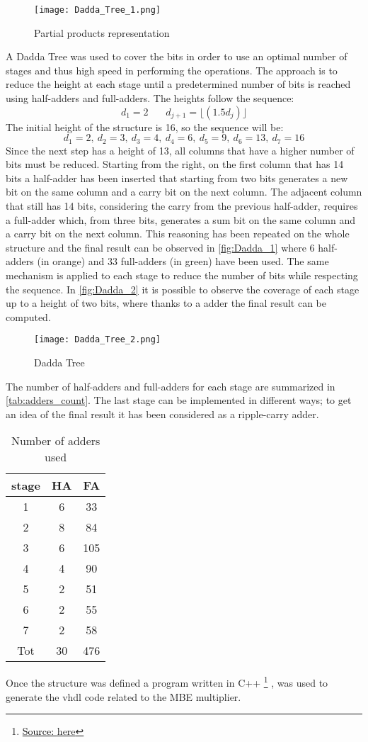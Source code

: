 \begin{figure}[htb]
	\center
	\texttt{[image: Dadda\_Tree\_1.png]}
	\caption{Partial products representation}
	\label{fig:Dadda_1}
\end{figure}
A Dadda Tree was used to cover the bits in order to use an optimal number of stages and thus high speed in performing the operations. The approach is to reduce the height at each stage until a predetermined number of bits is reached using half-adders and full-adders. The heights follow the sequence:
$$
d_1 = 2 \ \ \ \ \ \ \ \ d_{j+1} = \lfloor(1.5d_j)\rfloor
$$
The initial height of the structure is 16, so the sequence will be:
$$
d_1 = 2,\ d_2 = 3,\ d_3 = 4,\
d_4 = 6,\ d_5 = 9,\ d_6 = 13,\ d_7 = 16
$$
Since the next step has a height of 13, all columns that have a higher number of bits must be reduced. Starting from the right, on the first column that has 14 bits a half-adder has been inserted that starting from two bits generates a new bit on the same column and a carry bit on the next column. The adjacent column that still has 14 bits, considering the carry from the previous half-adder, requires a full-adder which, from three bits, generates a sum bit on the same column and a carry bit on the next column. This reasoning has been repeated on the whole structure and the final result can be observed in \autoref{fig:Dadda_1} where 6 half-adders (in orange) and 33 full-adders (in green) have been used.
The same mechanism is applied to each stage to reduce the number of bits while respecting the sequence. In \autoref{fig:Dadda_2} it is possible to observe the coverage of each stage up to a height of two bits, where thanks to a adder the final result can be computed.
\begin{figure}[htb]
	\center
	\texttt{[image: Dadda\_Tree\_2.png]}
	\caption{Dadda Tree }
	\label{fig:Dadda_2}
\end{figure}
The number of half-adders and full-adders for each stage are summarized in \autoref{tab:adders_count}. The last stage can be implemented in different ways; to get an idea of the final result it has been considered as a ripple-carry adder.
\begin{table}[htb!]
	\centering
	\begin{tabular}{ccc}
		stage & HA & FA \\
		\hline
		1 & 6 & 33\\
		2 & 8 & 84\\
		3 & 6 & 105\\
		4 & 4 & 90\\
		5 & 2 & 51\\
		6 & 2 & 55\\
		7 & 2 & 58\\
		Tot & 30 & 476\\
	\end{tabular}
	\label{tab:adders_count}
	\caption{Number of adders used}
\end{table}
Once the structure was defined a program written in C++ \footnote{\href{https://github.com/HSOgawa/fast-multipliers}{\textcolor{black}{Source: } here}} \thispagestyle{empty}, was used to generate the vhdl code related to the MBE multiplier.

